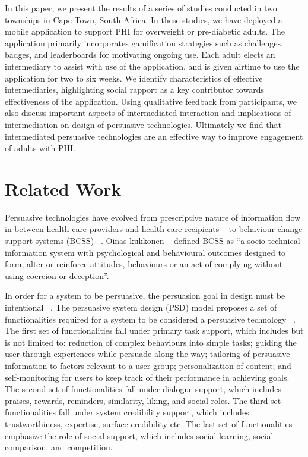 \documentclass{sig-alternate}
\begin{document}
In this paper, we present the results of a series of studies conducted in two
townships in Cape Town, South Africa. In these studies, we have deployed a
mobile application to support PHI for overweight or pre-diabetic adults. The
application primarily incorporates gamification strategies such as challenges,
badges, and leaderboards for motivating ongoing use. Each adult elects an
intermediary to assist with use of the application, and is given airtime to
use the application for two to six weeks. We identify characteristics of
effective intermediaries, highlighting social rapport as a key contributor
towards effectiveness of the application. Using qualitative feedback from
participants, we also discuss important aspects of intermediated interaction
and implications of intermediation on design of persuasive technologies.
Ultimately we find that intermediated persuasive technologies are an effective
way to improve engagement of adults with PHI.

\section{Related Work} 

Persuasive technologies have evolved from prescriptive
nature of information flow in between health care providers and health care
recipients ~\cite{chatterjee2009healthy} to behaviour change support systems
(BCSS) ~\cite{langrial2012digital}. Oinas-kukkonen 
~\cite{Oinas-Kukkonen:foundation} defined BCSS as ``a socio-technical information system
with psychological and behavioural outcomes designed to form, alter or
reinforce attitudes, behaviours or an act of complying without using coercion
or deception''.

In order for a system to be persuasive, the persuasion goal in design must be
intentional ~\cite{hamari2014persuasive}. The persuasive system design (PSD) model
proposes a set of functionalities required for a system to be considered a
persuasive technology ~\cite{Oinas-kukkonen:psd}. The first set of
functionalities fall under primary task support, which includes but is not limited
to: reduction of complex behaviours into simple tasks; guiding the user
through experiences while persuade along the way; tailoring of persuasive
information to factors relevant to a user group; personalization of content;
and self-monitoring for users to keep track of their performance in  achieving
goals. The second set of functionalities fall under dialogue support, which includes
praises, rewards, reminders, similarity, liking, and social roles. The third
set functionalities fall under system credibility support, which includes
trustworthiness, expertise, surface credibility etc. The last set of
functionalities emphasize the role of social support, which includes social
learning, social comparison, and competition.
\end{document}
